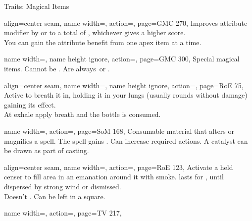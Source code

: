 \begin{PageBack}
\begin{Tables}{\backTableHeight}
\begin{Table}{Traits: Magical Items}
\begin{entry}{}{%
                align=center seam,
                name width=\conditionLength,%
                action=\Apex,
                page=GMC 270,
            }
                Improves attribute modifier by  or to a total of , whichever gives a higher score. \hfill
                 \\
                You can gain the attribute benefit from one apex item at a time.
            \end{entry}
            \begin{entry}{}{%
                name width=\conditionLength,%
                name height ignore,
                action=\Artifact,
                page=GMC 300,
            }
                Special magical items. Cannot be . Are always \Rare\,or \Unique.
            \end{entry}
            \begin{entry}{}{%
                align=center seam,
                name width=\conditionLength,%
                name height ignore,
                action=\BottledBreath,
                page=RoE 75,
            }
                Active to breath it in, holding it in your lungs (usually \Constitution rounds without damage) gaining its effect.\\
                At exhale apply breath and the bottle is consumed.
            \end{entry}
            \begin{entry}{}{%
                name width=\conditionLength,%
                action=\Catalyst,
                page=SoM 168,
            }
                Consumable material that alters or magnifies a spell.
                The spell gains \Manipulate.
                Can increase required actions.
                A catalyst can be drawn as part of casting.
            \end{entry}
            \begin{entry}{}{%
                align=center seam,
                name width=\conditionLength,%
                action=\Censer,
                page=RoE 123,
            }
                Activate a held censer to fill area in an emanation around it with smoke.
                lasts for , until dispersed by strong wind or dismissed.\\
                Doesn't .
                Can be left in a square.
            \end{entry}
            \begin{entry}{}{%
                name width=\conditionLength,%
                action=\Coda,
                page=TV 217,
            }

\end{entry}
\end{Table}
\end{Tables}
\end{PageBack}
